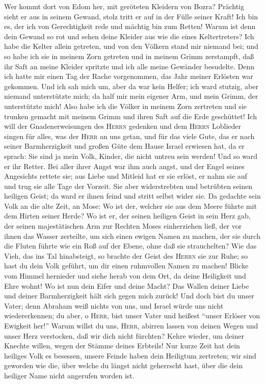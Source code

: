  Wer kommt dort von Edom her, mit geröteten Kleidern von
Bozra? Prächtig sieht er aus in seinem Gewand, stolz tritt er auf in der
Fülle seiner Kraft! Ich bin es, der ich von Gerechtigkeit rede und
mächtig bin zum Retten!  Warum ist denn dein Gewand so rot
und sehen deine Kleider aus wie die eines Keltertreters? 
Ich habe die Kelter allein getreten, und von den Völkern stand mir
niemand bei; und so habe ich sie in meinem Zorn getreten und in meinem
Grimm zerstampft, daß ihr Saft an meine Kleider spritzte und ich alle
meine Gewänder besudelte.  Denn ich hatte mir einen Tag
der Rache vorgenommen, das Jahr meiner Erlösten war gekommen.
 Und ich sah mich um, aber da war kein Helfer; ich ward
stutzig, aber niemand unterstützte mich; da half mir mein eigener Arm,
und mein Grimm, der unterstützte mich!  Also habe ich die
Völker in meinem Zorn zertreten und sie trunken gemacht mit meinem Grimm
und ihren Saft auf die Erde geschüttet!  Ich will der
Gnadenerweisungen des \textsc{Herrn} gedenken und dem \textsc{Herrn}
Loblieder singen für alles, was der \textsc{Herr} an uns getan, und für
das viele Gute, das er nach seiner Barmherzigkeit und großen Güte dem
Hause Israel erwiesen hat,  da er sprach: Sie sind ja mein
Volk, Kinder, die nicht untreu sein werden!  Und so ward
er ihr Retter. Bei aller ihrer Angst war ihm auch angst, und der Engel
seines Angesichts rettete sie; aus Liebe und Mitleid hat er sie erlöst,
er nahm sie auf und trug sie alle Tage der Vorzeit.  Sie
aber widerstrebten und betrübten seinen heiligen Geist; da ward er ihnen
feind und stritt selbst wider sie.  Da gedachte sein Volk
an die alte Zeit, an Mose: Wo ist der, welcher sie aus dem Meere führte
mit dem Hirten seiner Herde? Wo ist er, der seinen heiligen Geist in
sein Herz gab,  der seinen majestätischen Arm zur Rechten
Moses einherziehen ließ, der vor ihnen das Wasser zerteilte, um sich
einen ewigen Namen zu machen,  der sie durch die Fluten
führte wie ein Roß auf der Ebene, ohne daß sie strauchelten?
 Wie das Vieh, das ins Tal hinabsteigt, so brachte der
Geist des \textsc{Herrn} sie zur Ruhe; so hast du dein Volk geführt, um
dir einen ruhmvollen Namen zu machen!  Blicke vom Himmel
hernieder und siehe herab von dem Ort, da deine Heiligkeit und Ehre
wohnt! Wo ist nun dein Eifer und deine Macht? Das Wallen deiner Liebe
und deiner Barmherzigkeit hält sich gegen mich zurück! 
Und doch bist du unser Vater; denn Abraham weiß nichts von uns, und
Israel würde uns nicht wiedererkennen; du aber, o \textsc{Herr}, bist
unser Vater und heißest ``unser Erlöser von Ewigkeit her!''
 Warum willst du uns, \textsc{Herr}, abirren lassen von
deinen Wegen und unser Herz verstocken, daß wir dich nicht fürchten?
Kehre wieder, um deiner Knechte willen, wegen der Stämme deines
Erbteils!  Nur kurze Zeit hat dein heiliges Volk es
besessen, unsere Feinde haben dein Heiligtum zertreten; 
wir sind geworden wie die, über welche du längst nicht geherrscht hast,
über die dein heiliger Name nicht angerufen worden ist.

